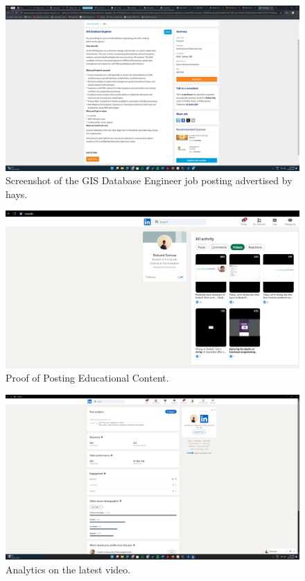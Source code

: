 \documentclass{article}
\begin{document}
\vspace{1cm}

\begin{figure}[h!]
    \centering
    \includegraphics[width=\textwidth]{../job_posting_gis.png}
    \caption{Screenshot of the GIS Database Engineer job posting advertised by hays.}
    \label{fig:Job with hays}
\end{figure}

\begin{figure}[h!]
    \centering
    \includegraphics[width=\textwidth]{../haskell_videos_posting.png}
    \caption{Proof of Posting Educational Content.}
    \label{fig:Linkedin Content }
\end{figure}


\begin{figure}[h!]
    \centering
    \includegraphics[width=\textwidth]{../Analytics_on_latest_video.png}
    \caption{Analytics on the latest video.}
    \label{fig:Linkedin Content-2}
\end{figure}
\end{document}
